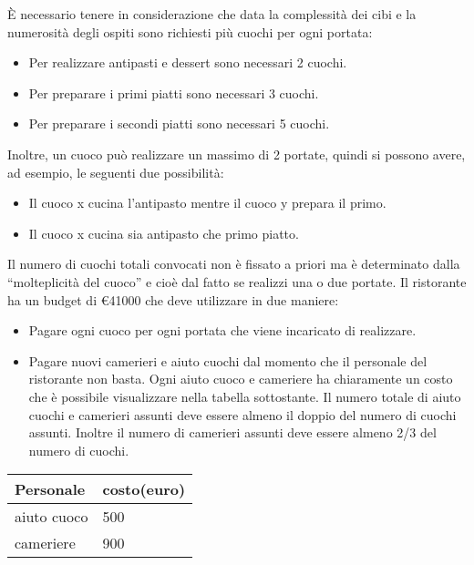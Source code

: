 \documentclass[../modello-progetto.tex]{subfiles}
\begin{document}
È necessario tenere in considerazione che data la complessità dei cibi e la numerosità degli ospiti sono richiesti più cuochi per ogni portata:
\begin{itemize}
	\item Per realizzare antipasti e dessert sono necessari 2 cuochi.
	\item Per preparare i primi piatti sono necessari 3 cuochi.
	\item Per preparare i secondi piatti sono necessari 5 cuochi.
\end{itemize}
Inoltre, un cuoco può realizzare un massimo di 2 portate, quindi si possono avere, ad esempio, le seguenti due possibilità:
\begin{itemize}
	\item Il cuoco x cucina l'antipasto mentre il cuoco y prepara il primo.
	\item Il cuoco x cucina sia antipasto che primo piatto.
\end{itemize}
Il numero di cuochi totali convocati non è fissato a priori ma è determinato dalla ``molteplicità del cuoco'' e cioè dal fatto se realizzi una o due portate.
Il ristorante ha un budget di €41000 che deve utilizzare in due maniere:
\begin{itemize}
	\item Pagare ogni cuoco per ogni portata che viene incaricato di realizzare.
	\item Pagare nuovi camerieri e aiuto cuochi dal momento che il personale del ristorante non basta. Ogni aiuto cuoco e cameriere ha chiaramente un costo che è possibile visualizzare nella tabella sottostante. Il numero totale di aiuto cuochi e camerieri assunti deve essere almeno il doppio del numero di cuochi assunti. Inoltre il numero di camerieri assunti deve essere almeno 2/3 del numero di cuochi.
\end{itemize}
\begin{center}
	\begin{tabular}{p{2.5cm} | p{2.5cm}}
	\hline
		Personale & costo(euro) \\
	\hline
	\hline
		aiuto cuoco & 500 \\
		cameriere & 900 \\
	\hline
	\end{tabular}
 \end{center}
\end{document}
